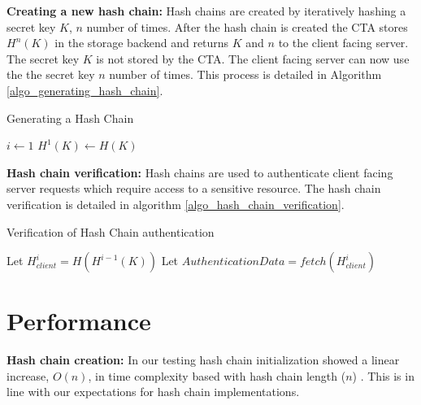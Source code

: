 \documentclass[a4paper,twoside]{article}
\begin{document}
\textbf{Creating a new hash chain:}
Hash chains are created by iteratively hashing a secret key $K$, $n$ number of times. 
After the hash chain is created the CTA stores $H^{n}(K)$ in the storage backend and returns $K$ and $n$ to the client facing server. The secret key $K$ is not stored by the CTA. The client facing server can now use the the secret key $n$ number of times. This process is detailed in Algorithm  \ref{algo_generating_hash_chain}.

\begin{algorithm}
\SetAlgoLined
\caption{Generating a Hash Chain}
\label{algo_generating_hash_chain}
\LinesNumbered
{}
$i \leftarrow 1 $\;
$H^{1}(K) \leftarrow H(K)$ \;
 \;
\end{algorithm}
\textbf{Hash chain verification:}
Hash chains are used to authenticate client facing server requests which require access to a sensitive resource. The hash chain verification is detailed in algorithm \ref{algo_hash_chain_verification}.

\begin{algorithm}
\SetAlgoLined
\caption{Verification of Hash Chain authentication}
\label{algo_hash_chain_verification}
\LinesNumbered
{}
	Let $H_{client}^{i} = H(H^{i-1}(K))$ \;
	Let $AuthenticationData = fetch(H_{client}^{i})$ \;
	
\end{algorithm}

\section{Performance}

\textbf{Hash chain creation:}
In our testing hash chain initialization showed a linear increase, $O(n)$, in time complexity based with hash chain length ($n$) . This is in line with our expectations for hash chain implementations.
\end{document}
